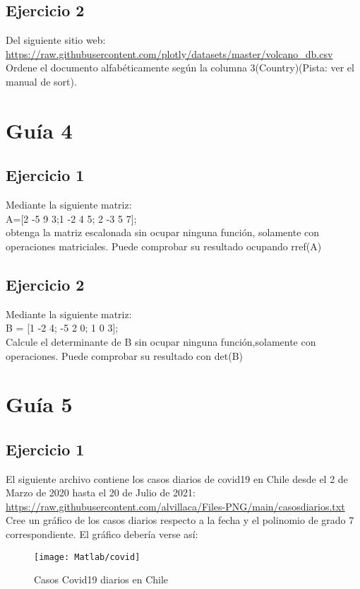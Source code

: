 \subsection{Ejercicio 2}
Del siguiente sitio web: \\
\url{https://raw.githubusercontent.com/plotly/datasets/master/volcano_db.csv}
Ordene el documento alfabéticamente según la columna 3(Country)(Pista: ver el manual de sort). 
\begin{figure}
	
\end{figure}
\newpage
\section{Guía 4}
\subsection{Ejercicio 1}
Mediante la siguiente matriz:\\
A=[2 -5 9 3;1 -2 4 5; 2 -3 5 7];\\
obtenga la matriz escalonada sin ocupar ninguna función, solamente con operaciones matriciales. Puede comprobar su resultado ocupando rref(A)
\subsection{Ejercicio 2}
Mediante la siguiente matriz:\\
B = [1 -2 4; -5 2 0; 1 0 3]; \\
Calcule el determinante de B sin ocupar ninguna función,solamente con operaciones. Puede comprobar su resultado con det(B)\newpage
\section{Guía 5}
\subsection{Ejercicio 1}
El siguiente archivo contiene los casos diarios de covid19 en Chile desde el 2 de Marzo de 2020 hasta el 20 de Julio de 2021: \\
\url{https://raw.githubusercontent.com/alvillaca/Files-PNG/main/casosdiarios.txt}\\
Cree un gráfico de los casos diarios respecto a la fecha y el polinomio de grado 7 correspondiente. El gráfico debería verse así:
\begin{figure}[h]
	\centering
	\texttt{[image: Matlab/covid]}
	\caption{Casos Covid19 diarios en Chile}
	\label{fig:covid}
\end{figure}

